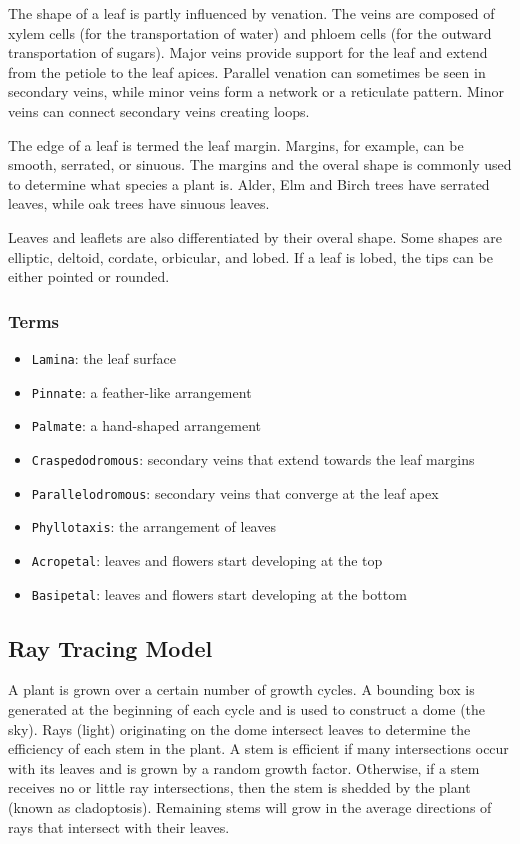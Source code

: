 \documentclass[10pt]{article}
\begin{document}
The shape of a leaf is partly influenced by venation. The veins are composed of xylem cells (for the transportation of water) and phloem cells (for the outward transportation of sugars). Major veins provide support for the leaf and extend from the petiole to the leaf apices. Parallel venation can sometimes be seen in secondary veins, while minor veins form a network or a reticulate pattern. Minor veins can connect secondary veins creating loops.

The edge of a leaf is termed the leaf margin. Margins, for example, can be smooth, serrated, or sinuous. The margins and the overal shape is commonly used to determine what species a plant is. Alder, Elm and Birch trees have serrated leaves, while oak trees have sinuous leaves.

Leaves and leaflets are also differentiated by their overal shape. Some shapes are elliptic, deltoid, cordate, orbicular, and lobed. If a leaf is lobed, the tips can be either pointed or rounded.

\subsubsection{Terms}

\begin{itemize}
\item \texttt{Lamina}: the leaf surface
\item \texttt{Pinnate}: a feather-like arrangement
\item \texttt{Palmate}: a hand-shaped arrangement
\item \texttt{Craspedodromous}: secondary veins that extend towards the leaf margins
\item \texttt{Parallelodromous}: secondary veins that converge at the leaf apex
\item \texttt{Phyllotaxis}: the arrangement of leaves
\item \texttt{Acropetal}: leaves and flowers start developing at the top
\item \texttt{Basipetal}: leaves and flowers start developing at the bottom
\end{itemize}

\subsection{Ray Tracing Model}

A plant is grown over a certain number of growth cycles. A bounding box is generated at the beginning of each cycle and is used to construct a dome (the sky). Rays (light) originating on the dome intersect leaves to determine the efficiency of each stem in the plant. A stem is efficient if many intersections occur with its leaves and is grown by a random growth factor. Otherwise, if a stem receives no or little ray intersections, then the stem is shedded by the plant (known as cladoptosis). Remaining stems will grow in the average directions of rays that intersect with their leaves.
\end{document}
